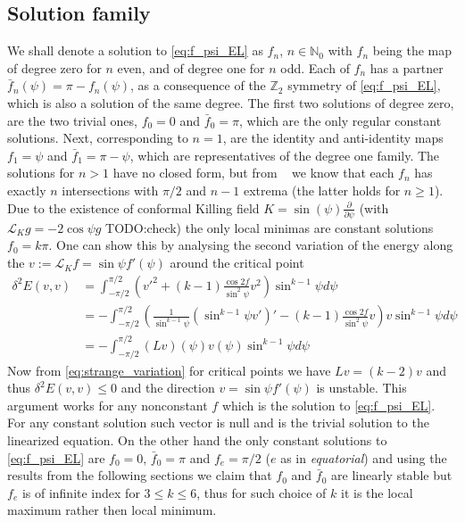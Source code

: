 \subsection{Solution family}
\label{sec:solution-family}

We shall denote a solution to \eqref{eq:f_psi_EL} as $f_n$,
$n\in\mathbb{N}_0$ with $f_n$ being the map of degree zero for $n$
even, and of degree one for $n$ odd. Each of $f_n$ has a partner
$\bar{f}_n(\psi)=\pi-f_n(\psi)$, as a consequence of the
$\mathbb{Z}_2$ symmetry of \eqref{eq:f_psi_EL}, which is also a
solution of the same degree. The first two solutions of degree zero,
are the two trivial ones, $f_0=0$ and $\bar{f}_0=\pi$, which are the
only regular constant solutions. Next, corresponding to $n=1$, are the
identity and anti-identity maps $f_1=\psi$ and $\bar{f}_1=\pi-\psi$,
which are representatives of the degree one family. The solutions for
$n>1$ have no closed form, but from ~\cite{Bizon1997} we know that
each $f_n$ has exactly $n$ intersections with $\pi/2$ and $n-1$
extrema (the latter holds for $n\ge1$).\\

Due to the existence of conformal Killing field
$K=\sin(\psi)\frac{\partial}{\partial \psi}$ (with $\mathcal{L}_K
g=-2\cos\psi g$ TODO:check) the only local minimas are constant
solutions $f_0=k\pi$. One can show this by analysing the second
variation of the energy along the $v:=\mathcal{L}_K f=\sin\psi
f'(\psi)$ around the critical point
\begin{align}
  \delta^2E(v,v)
  &=\int_{-\pi/2}^{\pi/2}
  \left(
    v'^2+(k-1)\frac{\cos2f}{\sin^2\psi}v^2
  \right)\sin^{k-1}\psi d\psi\\
  &=-\int_{-\pi/2}^{\pi/2}
  \left(\frac{1}{\sin^{k-1}\psi}\left(\sin^{k-1}\psi
      v'\right)'-(k-1)\frac{\cos2f}{\sin^2\psi}v\right)v\sin^{k-1}\psi
  d\psi\\
  &=-\int_{-\pi/2}^{\pi/2}(Lv)(\psi)v(\psi)\sin^{k-1}\psi d\psi
\end{align}
Now from \eqref{eq:strange_variation} for critical points we have
$Lv=(k-2)v$ and thus $\delta^2 E(v,v)\le0$ and the direction
$v=\sin\psi f'(\psi)$ is unstable. This argument works for any
nonconstant $f$ which is the solution to \eqref{eq:f_psi_EL}. For any
constant solution such vector is null and is the trivial solution to
the linearized equation. On the other hand the only constant solutions
to \eqref{eq:f_psi_EL} are $f_0=0$, $\bar{f}_0=\pi$ and $f_e=\pi/2$
($e$ as in \emph{equatorial}) and using the results from the following
sections we claim that $f_0$ and $\bar{f}_0$ are linearly stable but
$f_e$ is of infinite index for $3\le k\le6$, thus for such choice of
$k$ it is the local maximum rather then local minimum.

